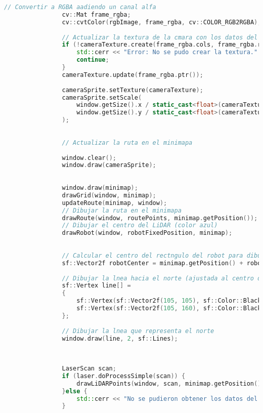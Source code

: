\begin{lstlisting}[language={C++}, caption={Quinto ajuste de c\'odigo}, label={QuintoAjuste}]
                // Convertir a RGBA aadiendo un canal alfa
                cv::Mat frame_rgba;
                cv::cvtColor(rgbImage, frame_rgba, cv::COLOR_RGB2RGBA);
        
                // Actualizar la textura de la cmara con los datos del frame
                if (!cameraTexture.create(frame_rgba.cols, frame_rgba.rows)) {
                    std::cerr << "Error: No se pudo crear la textura." << std::endl;
                    continue;
                }
                cameraTexture.update(frame_rgba.ptr());
        
                cameraSprite.setTexture(cameraTexture);
                cameraSprite.setScale(
                    window.getSize().x / static_cast<float>(cameraTexture.getSize().x),
                    window.getSize().y / static_cast<float>(cameraTexture.getSize().y)
                );
        
        
                // Actualizar la ruta en el minimapa
                
                window.clear();
                window.draw(cameraSprite);
        
                
                window.draw(minimap);
                drawGrid(window, minimap);
                updateRoute(minimap, window);
                // Dibujar la ruta en el minimapa
                drawRoute(window, routePoints, minimap.getPosition());
                // Dibujar el centro del LiDAR (color azul)
                drawRobot(window, robotFixedPosition, minimap);
        
        
                // Calcular el centro del rectngulo del robot para dibujar la lnea que indica el norte
                sf::Vector2f robotCenter = minimap.getPosition() + robotFixedPosition;
        
                // Dibujar la lnea hacia el norte (ajustada al centro del rectngulo)
                sf::Vertex line[] =
                {
                    sf::Vertex(sf::Vector2f(105, 105), sf::Color::Black), // Posicin inicial de la lnea
                    sf::Vertex(sf::Vector2f(105, 160), sf::Color::Black)   // Posicin final hacia arriba
                };
        
                // Dibujar la lnea que representa el norte
                window.draw(line, 2, sf::Lines);
        
        
        
                LaserScan scan;
                if (laser.doProcessSimple(scan)) {
                    drawLiDARPoints(window, scan, minimap.getPosition(), 25.0f, max_range);
                }else {
                    std::cerr << "No se pudieron obtener los datos del LiDAR." << std::endl;
                }
        

\end{lstlisting}
